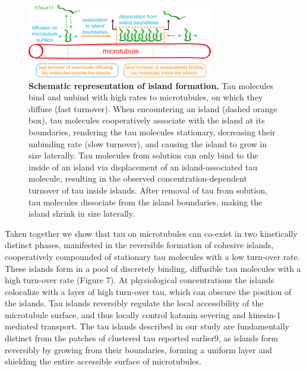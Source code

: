 \begin{figure}[h!tb]
\centering
\includegraphics[scale=1]{Figures/tau8.png}
\caption[Schematic representation of island formation.]{
\textbf{Schematic representation of island formation.} Tau molecules bind and unbind with high rates to microtubules, on which they diffuse (fast turnover). When encountering an island (dashed orange box), tau molecules cooperatively associate with the island at its boundaries, rendering the tau molecules stationary, decreasing their unbinding rate (slow turnover), and causing the island to grow in size laterally. Tau molecules from solution can only bind to the inside of an island via displacement of an island-associated tau molecule, resulting in the observed concentration-dependent turnover of tau inside islands. After removal of tau from solution, tau molecules dissociate from the island boundaries, making the island shrink in size laterally.
	}\label{tau8}
\end{figure}
Taken together we show that tau on microtubules can co-exist in two kinetically distinct phases, manifested in the reversible formation of cohesive islands, cooperatively compounded of stationary tau molecules with a low turn-over rate. These islands form in a pool of discretely binding, diffusible tau molecules with a high turn-over rate (Figure 7). At physiological concentrations the islands colocalize with a layer of high turn-over tau, which can obscure the position of the islands. Tau islands reversibly regulate the local accessibility of the microtubule surface, and thus locally control katanin severing and kinesin-1 mediated transport. The tau islands described in our study are fundamentally distinct from the patches of clustered tau reported earlier9, as islands form reversibly by growing from their boundaries, forming a uniform layer and shielding the entire accessible surface of microtubules.

